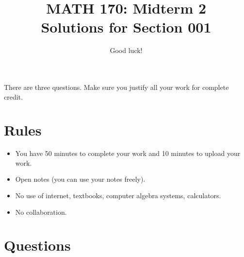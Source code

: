 \documentclass[12pt]{amsart}
\title{ MATH 170: Midterm 2 \\
\tiny{Solutions for Section 001}}
\author{Good luck!}
\date{}
\begin{document}
\maketitle

There are three questions. Make sure you justify all your work for complete credit.

\section*{Rules}

\begin{itemize}[leftmargin=*]
    \item You have 50 minutes to complete your work and 10 minutes to upload your work.
    \item Open notes (you can use your notes freely).
    \item No use of internet, textbooks, computer algebra systems, calculators. 
    \item No collaboration.
\end{itemize}

\section*{Questions}
\end{document}
